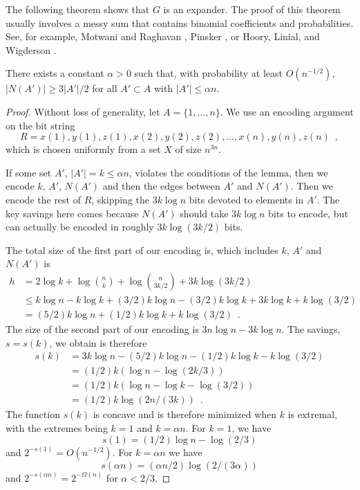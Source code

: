 \documentclass{patmorin}
\begin{document}
The following theorem shows that $G$ is an expander.  The proof of
this theorem usually involves a messy sum that contains binomial
coefficients and probabilities.  See, for example, Motwani and
Raghavan \cite[Theorem~5.3]{motwani.raghavan:randomized}, Pinsker
\cite[Lemma 1]{pinsker:on}, or Hoory, Linial, and Wigderson
\cite[Lemma~1.9]{hoory.linial.ea:expander}.

\begin{thm}
  There exists a constant $\alpha >0$ such that, with probability at
  least $O(n^{-1/2})$, $|N(A')| \ge 3|A'|/2$ for all $A'\subset A$
  with $|A'|\le \alpha n$.
\end{thm}

\begin{proof}
Without loss of generality, let $A=\{1,\ldots,n\}$.  We use an encoding argument on the bit string
\[
   R = x(1), y(1), z(1), x(2), y(2), z(2), \ldots, x(n), y(n), z(n) \enspace ,
\]
which is chosen uniformly from a set $X$ of size $n^{3n}$.

If some set $A'$, $|A'|=k\le \alpha n$, violates the conditions of the
lemma, then we encode $k$, $A'$, $N(A')$ and then the edges between
$A'$ and $N(A')$. Then we encode the rest of $R$, skipping the
$3k\log n$ bits devoted to elements in $A'$.  The key savings here
comes because $N(A')$ should take $3k\log n$ bits to encode, but can
actually be encoded in roughly $3k\log(3k/2)$ bits.

The total size of the first part of our encoding is, which includes $k$,
$A'$ and $N(A')$ is
\begin{align*}
    h & = 2\log k + \log\binom{n}{k} + \log\binom{n}{3k/2} + 3k\log (3k/2) \\
       & \le k\log n - k\log k + (3/2)k\log n - (3/2)k\log k + 3k\log k + k\log(3/2) \\
      & = (5/2)k\log n + (1/2)k\log k + k\log(3/2)  \enspace .
\end{align*}
The size of the second part of our encoding is $3n\log n - 3k\log n$.  The savings, $s=s(k)$, we obtain is therefore
\begin{align*}
     s(k) & = 3k\log n - (5/2)k\log n - (1/2)k\log k - k\log(3/2) \\
       & = (1/2)k(\log n - \log(2k/3)) \\
       & = (1/2)k(\log n - \log k - \log(3/2)) \\
       & = (1/2)k\log(2n/(3k)) \enspace .
\end{align*}
The function $s(k)$ is concave and is therefore minimized when $k$
is extremal, with the extremes being $k=1$ and $k=\alpha
n$. For $k=1$, we have
\[
    s(1)=(1/2)\log n - \log(2/3)
\]
and $2^{-s(1)} = O(n^{-1/2})$.  For $k=\alpha n$ we have
\[
   s(\alpha n) = (\alpha n/2)\log(2/(3\alpha))
\]
and $2^{-s(\alpha n)} = 2^{-\Omega(n)}$ for $\alpha < 2/3$.
\end{proof}
\end{document}
